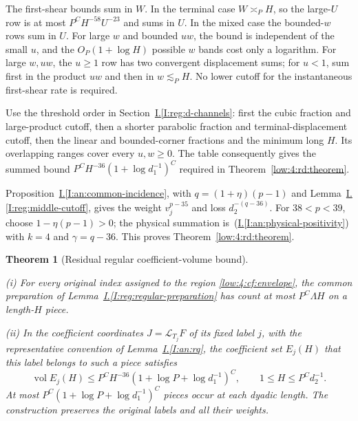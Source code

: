 \documentclass[11pt]{amsart}
\newtheorem{theorem}{Theorem}[section]
\theoremstyle{definition}
\theoremstyle{remark}
\DeclareMathOperator{\vol}{vol}
\numberwithin{equation}{section}
\newcommand{\partIref}[1]{\hyperref[I:#1]{I.\ref*{I:#1}}}
\newcommand{\partIeqref}[1]{\textup{(\partIref{#1})}}
\begin{document}
The first-shear bounds sum in $W$. In the terminal case $W\asymp_PH$, so the large-$U$ row is at most $P^CH^{-58}U^{-23}$ and sums in $U$. In the mixed case the bounded-$w$ rows sum in $U$. For large $w$ and bounded $uw$, the bound is independent of the small $u$, and the $O_P(1+\log H)$ possible $w$ bands cost only a logarithm. For large $w,uw$, the $u\ge1$ row has two convergent displacement sums; for $u<1$, sum first in the product $uw$ and then in $w\lesssim_PH$. No lower cutoff for the instantaneous first-shear rate is required.

Use the threshold order in Section~\partIref{reg:d-channels}: first the cubic fraction and large-product cutoff, then a shorter parabolic fraction and terminal-displacement cutoff, then the linear and bounded-corner fractions and the minimum long $H$. Its overlapping ranges cover every $u,w\ge0$. The table consequently gives the summed bound $P^CH^{-36}(1+\log d_1^{-1})^C$ required in Theorem~\ref{low:4:rd:theorem}.

Proposition~\partIref{an:common-incidence}, with $q=(1+\eta)(p-1)$ and Lemma~\partIref{reg:middle-cutoff}, gives the weight $v_j^{p-35}$ and loss $d_2^{-(q-36)}$. For $38<p<39$, choose $1-\eta(p-1)>0$; the physical summation is~\partIeqref{an:physical-positivity} with $k=4$ and $\gamma=q-36$. This proves Theorem~\ref{low:4:rd:theorem}.
\begin{theorem}[Residual regular coefficient-volume bound]\label{low:4:rr:tail}

\noindent\textup{(i)} For every original index assigned to the region \eqref{low:4:cf:envelope}, the common preparation of Lemma~\partIref{reg:regular-preparation} has count at most $P^C\Lambda H$ on a length-$H$ piece.

\noindent\textup{(ii)} In the coefficient coordinates $J=\mathcal L_{T_j}F$ of its fixed label $j$, with the representative convention of Lemma~\partIref{an:rq}, the coefficient set $E_j(H)$ that this label belongs to such a piece satisfies
\[
\vol E_j(H)\le P^C H^{-36}(1+\log P+\log d_1^{-1})^C,
\qquad 1\le H\le P^C d_2^{-1}.
\]
At most $P^C(1+\log P+\log d_1^{-1})^C$ pieces occur at each dyadic length. The construction preserves the original labels and all their weights.
\end{theorem}
\end{document}
